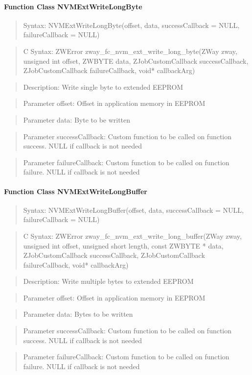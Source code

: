 \paragraph{Function Class NVMExtWriteLongByte}
\begin{quote}Syntax: NVMExtWriteLongByte(offset, data, successCallback = NULL, failureCallback = NULL)\end{quote}
\begin{quote}C Syntax: ZWError zway\_fc\_nvm\_ext\_write\_long\_byte(ZWay zway, unsigned int offset, ZWBYTE data, ZJobCustomCallback successCallback, ZJobCustomCallback failureCallback, void* callbackArg)\end{quote}
\begin{quote}Description: Write single byte to extended EEPROM\end{quote}
\begin{quote}Parameter offset: Offset in application memory in EEPROM\end{quote}
\begin{quote}Parameter data: Byte to be written\end{quote}
\begin{quote}Parameter successCallback: Custom function to be called on function success. NULL if callback is not needed\end{quote}
\begin{quote}Parameter failureCallback: Custom function to be called on function failure. NULL if callback is not needed\end{quote}


\paragraph{Function Class NVMExtWriteLongBuffer}
\begin{quote}Syntax: NVMExtWriteLongBuffer(offset, data, successCallback = NULL, failureCallback = NULL)\end{quote}
\begin{quote}C Syntax: ZWError zway\_fc\_nvm\_ext\_write\_long\_buffer(ZWay zway, unsigned int offset, unsigned short length, const ZWBYTE * data, ZJobCustomCallback successCallback, ZJobCustomCallback failureCallback, void* callbackArg)\end{quote}
\begin{quote}Description: Write multiple bytes to extended EEPROM\end{quote}
\begin{quote}Parameter offset: Offset in application memory in EEPROM\end{quote}
\begin{quote}Parameter data: Bytes to be written\end{quote}
\begin{quote}Parameter successCallback: Custom function to be called on function success. NULL if callback is not needed\end{quote}
\begin{quote}Parameter failureCallback: Custom function to be called on function failure. NULL if callback is not needed\end{quote}


